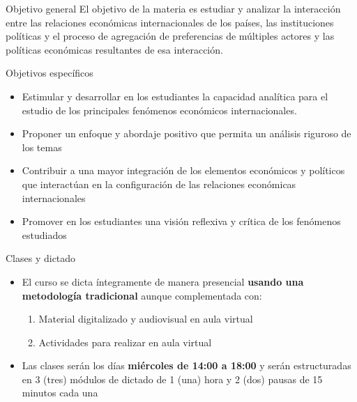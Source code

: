 \documentclass[
  ignorenonframetext,
]{beamer}
\providecommand{\tightlist}{%
  \setlength{\itemsep}{0pt}\setlength{\parskip}{0pt}}\usepackage{longtable,booktabs,array}
\begin{document}
\begin{frame}{Objetivo general}
\protect\hypertarget{objetivo-general}{}
El objetivo de la materia es estudiar y analizar la interacción entre
las relaciones económicas internacionales de los países, las
instituciones políticas y el proceso de agregación de preferencias de
múltiples actores y las políticas económicas resultantes de esa
interacción.
\end{frame}

\begin{frame}{Objetivos específicos}
\protect\hypertarget{objetivos-especuxedficos}{}
\begin{itemize}
\tightlist
\item
  Estimular y desarrollar en los estudiantes la capacidad analítica para
  el estudio de los principales fenómenos económicos internacionales.
\item
  Proponer un enfoque y abordaje positivo que permita un análisis
  riguroso de los temas
\item
  Contribuir a una mayor integración de los elementos económicos y
  políticos que interactúan en la configuración de las relaciones
  económicas internacionales
\item
  Promover en los estudiantes una visión reflexiva y crítica de los
  fenómenos estudiados
\end{itemize}
\end{frame}

\begin{frame}{Clases y dictado}
\protect\hypertarget{clases-y-dictado}{}
\begin{itemize}
\tightlist
\item
  El curso se dicta íntegramente de manera presencial \textbf{usando una
  metodología tradicional} aunque complementada con:

  \begin{enumerate}
  \tightlist
  \item
    Material digitalizado y audiovisual en aula virtual
  \item
    Actividades para realizar en aula virtual
  \end{enumerate}
\item
  Las clases serán los días \textbf{miércoles de 14:00 a 18:00} y serán
  estructuradas en 3 (tres) módulos de dictado de 1 (una) hora y 2 (dos)
  pausas de 15 minutos cada una
\end{itemize}
\end{frame}
\end{document}

